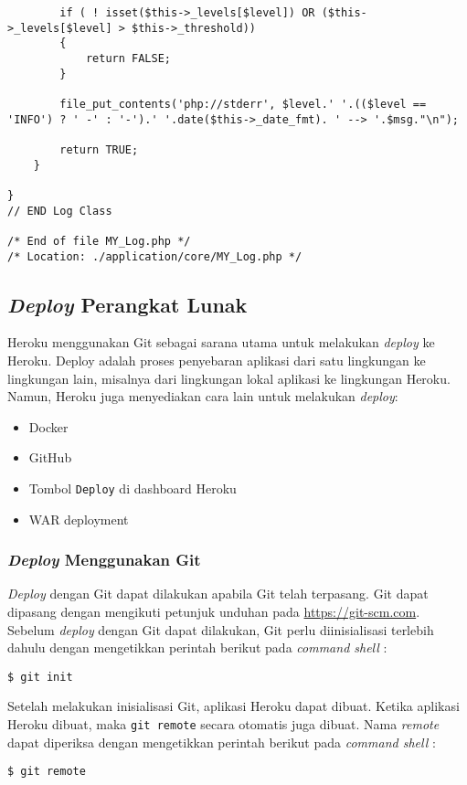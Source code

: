 \begin{lstlisting}
        if ( ! isset($this->_levels[$level]) OR ($this->_levels[$level] > $this->_threshold))
        {
            return FALSE;
        }

        file_put_contents('php://stderr', $level.' '.(($level == 'INFO') ? ' -' : '-').' '.date($this->_date_fmt). ' --> '.$msg."\n");

        return TRUE;
    }

}
// END Log Class

/* End of file MY_Log.php */
/* Location: ./application/core/MY_Log.php */
\end{lstlisting}

\subsection{\textit{Deploy} Perangkat Lunak}
Heroku menggunakan Git sebagai sarana  utama untuk melakukan \textit{deploy} ke Heroku. Deploy adalah proses penyebaran aplikasi dari satu lingkungan ke lingkungan lain, misalnya dari lingkungan lokal aplikasi ke lingkungan Heroku. Namun, Heroku juga menyediakan cara lain untuk melakukan \textit{deploy}:
\begin{itemize}
\item Docker
\item GitHub
\item Tombol \texttt{Deploy} di dashboard Heroku
\item WAR deployment
\end{itemize}

\subsubsection{\textit{Deploy} Menggunakan Git}
\textit{Deploy} dengan Git dapat dilakukan apabila Git telah terpasang. Git dapat dipasang dengan mengikuti petunjuk unduhan pada \url{https://git-scm.com}. Sebelum \textit{deploy} dengan Git dapat dilakukan, Git perlu diinisialisasi terlebih dahulu dengan mengetikkan perintah berikut pada \textit{command shell} :
\begin{lstlisting}
$ git init
\end{lstlisting}

Setelah melakukan inisialisasi Git, aplikasi Heroku dapat dibuat. Ketika aplikasi Heroku dibuat, maka \texttt{git remote} secara otomatis juga dibuat. Nama \textit{remote} dapat diperiksa dengan mengetikkan perintah berikut pada \textit{command shell} :
\begin{lstlisting}
$ git remote
\end{lstlisting}

